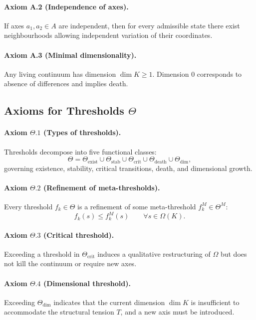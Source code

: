 \paragraph{Axiom A.2 (Independence of axes).}
If axes \(a_1,a_2\in A\) are independent, then for every admissible state there exist neighbourhoods allowing independent variation of their coordinates.

\paragraph{Axiom A.3 (Minimal dimensionality).}
Any living continuum has dimension \(\dim K \ge 1\).
Dimension \(0\) corresponds to absence of differences and implies death.

\subsection{Axioms for Thresholds \texorpdfstring{\(\Theta\)}{\Theta}}

\paragraph{Axiom \texorpdfstring{\(\Theta.1\)}{\Theta.1} (Types of thresholds).}
Thresholds decompose into five functional classes:
\[
  \Theta = \Theta_{\mathrm{exist}} \cup \Theta_{\mathrm{stab}} \cup
  \Theta_{\mathrm{crit}} \cup \Theta_{\mathrm{death}} \cup \Theta_{\mathrm{dim}},
\]
governing existence, stability, critical transitions, death, and dimensional growth.

\paragraph{Axiom \texorpdfstring{\(\Theta.2\)}{\Theta.2} (Refinement of meta-thresholds).}
Every threshold \(f_k\in\Theta\) is a refinement of some meta-threshold \(f_k^M\in \Theta^M\):
\[
  f_k(s)\le f_k^M(s)\qquad\forall s\in\Omega(K).
\]

\paragraph{Axiom \texorpdfstring{\(\Theta.3\)}{\Theta.3} (Critical threshold).}
Exceeding a threshold in \(\Theta_{\mathrm{crit}}\) induces a qualitative restructuring of \(\Omega\) but does not kill the continuum or require new axes.

\paragraph{Axiom \texorpdfstring{\(\Theta.4\)}{\Theta.4} (Dimensional threshold).}
Exceeding \(\Theta_{\mathrm{dim}}\) indicates that the current dimension \(\dim K\) is insufficient to accommodate the structural tension \(T\), and a new axis must be introduced.


